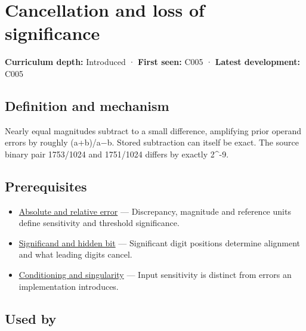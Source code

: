 \hypertarget{appendix-a2773a6a2f9d}{}\label{referencestart:appendix-a2773a6a2f9d}
\section{Cancellation and loss of significance}\label{appendix-a2773a6a2f9d-cancellation-and-loss-of-significance}

\textbf{Curriculum depth:} Introduced · \textbf{First seen:} C005 · \textbf{Latest development:} C005

\begin{allmightroledefinition}

\subsection{Definition and mechanism}\label{appendix-a2773a6a2f9d-definition-and-mechanism}

Nearly equal magnitudes subtract to a small difference, amplifying prior operand errors by roughly (\textbar a\textbar+\textbar b\textbar)/\textbar a−b\textbar. Stored subtraction can itself be exact. The source binary pair 1753/1024 and 1751/1024 differs by exactly 2\^{}-9.

\end{allmightroledefinition}

\subsection{Prerequisites}\label{appendix-a2773a6a2f9d-prerequisites}

\begin{itemize}
\tightlist
\item
  \hyperref[appendix-3ae74e89b4e6]{Absolute and relative error} --- Discrepancy, magnitude and reference units define sensitivity and threshold significance.
\item
  \hyperref[appendix-a24fd710cf67]{Significand and hidden bit} --- Significant digit positions determine alignment and what leading digits cancel.
\item
  \hyperref[appendix-8f6a01f284a7]{Conditioning and singularity} --- Input sensitivity is distinct from errors an implementation introduces.
\end{itemize}

\subsection{Used by}\label{appendix-a2773a6a2f9d-used-by}

